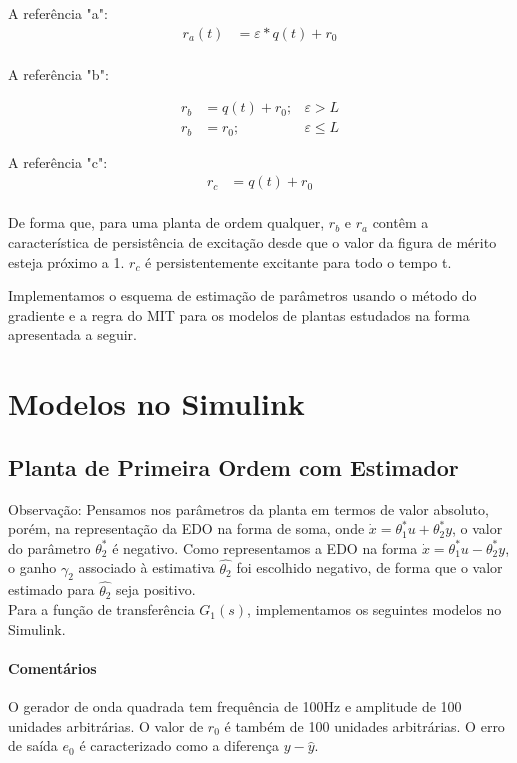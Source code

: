 \documentclass[
	12pt,				%
	openright,			%
	twoside,			%
	a4paper,			%
	english,			%
	french,				%
	spanish,			%
	brazil				%
	]{abntex2}
\begin{document}
 A referência "a":  \begin{align*}
    r_a(t) &= \varepsilon*q(t) + r_0  \\
  \end{align*}  
   
 A referência "b":
  
  \begin{align*}
      r_b &= q(t) + r_0 ; & \varepsilon > L  \\
      r_b &= r_0 ; & \varepsilon \leq L
  \end{align*}
  
 A referência "c": \begin{align*}
     r_c &= q(t) + r_0  \\
   \end{align*}  
  
  De forma que, para uma planta de ordem qualquer, $r_b$ e $r_a$ contêm a característica de persistência de excitação desde que o valor da figura de mérito esteja próximo a 1. $r_c$ é persistentemente excitante para todo o tempo t.  
  
  Implementamos o esquema de estimação de parâmetros usando o método do gradiente e a regra do MIT para os modelos de plantas estudados na forma apresentada a seguir.

\section{Modelos no Simulink}
\subsection{Planta de Primeira Ordem com Estimador}

Observação: Pensamos nos parâmetros da planta em termos de valor absoluto, porém, na representação da EDO na forma de soma, onde $\dot{x} = \theta_1^*u+\theta_2^*y$, o valor do parâmetro $\theta_2^*$ é negativo. Como representamos a EDO na forma $\dot{x} = \theta_1^*u-\theta_2^*y$, o ganho $\gamma_2$ associado à estimativa $\hat{\theta_2}$ foi escolhido negativo, de forma que o valor estimado para $\hat{\theta_2}$ seja positivo.\\

Para a função de transferência $G_1(s)$, implementamos os seguintes modelos no Simulink.\\

\paragraph*{Comentários}
O gerador de onda quadrada tem frequência de 100Hz e amplitude de 100 unidades arbitrárias. O valor de $r_0$ é também de 100 unidades arbitrárias. O erro de saída $e_0$ é caracterizado como a diferença $y-\hat{y}$.
\end{document}
